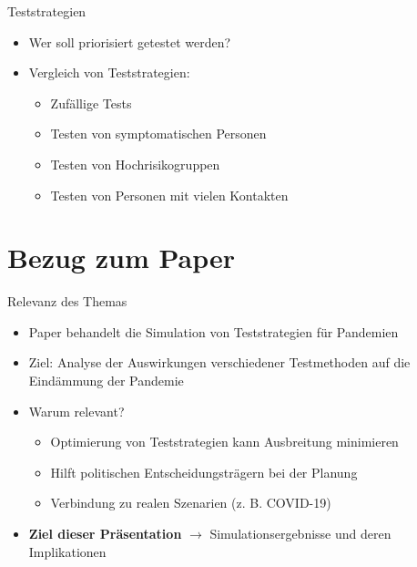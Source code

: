 \documentclass[ngerman,14pt,aspectratio=1610]{beamer}
\def\secname{Gliederung} %
\let\oldsection\section
\renewcommand{\section}[1]{
	\oldsection{#1}
	\newtotcounter{#1}
	\def\secname{#1}
}
\newcommand{\source}{}
\begin{document}
	\begin{frame}[t]{Teststrategien} \vspace{40pt}
		\begin{itemize}
			\item Wer soll priorisiert getestet werden?
			\item Vergleich von Teststrategien:
			\begin{itemize}
				\item Zufällige Tests
				\item Testen von symptomatischen Personen
				\item Testen von Hochrisikogruppen
				\item Testen von Personen mit vielen Kontakten
			\end{itemize}
		\end{itemize}
	\end{frame}
	
	\section{Bezug zum Paper}
	
	\renewcommand{\source}{ }
	
	\begin{frame}[t]{Relevanz des Themas} \vspace{5pt}
		\begin{itemize}
			\item Paper behandelt die Simulation von Teststrategien für Pandemien
			\item Ziel: Analyse der Auswirkungen verschiedener Testmethoden auf die Eindämmung der Pandemie
			\item Warum relevant?
			\begin{itemize}
				\item Optimierung von Teststrategien kann Ausbreitung minimieren
				\item Hilft politischen Entscheidungsträgern bei der Planung
				\item Verbindung zu realen Szenarien (z. B. COVID-19)
			\end{itemize}
			\item \textbf{\alert{Ziel dieser Präsentation}} $\rightarrow$ Simulationsergebnisse und deren Implikationen
		\end{itemize}
	\end{frame}
	
	\renewcommand{\source}{Quelle: \url{https://arxiv.org/pdf/2210.13089}}
	
\end{document}
